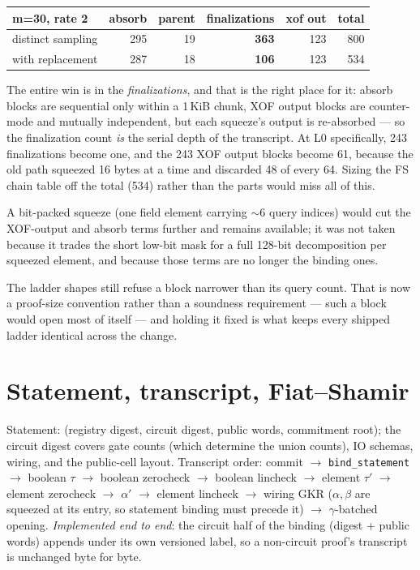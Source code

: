 \documentclass[11pt]{article}
\newcommand{\code}[1]{\texttt{#1}}
\theoremstyle{definition}
\begin{document}
\begin{center}
\begin{tabular}{lrrrrr}
\textbf{m=30, rate 2} & absorb & parent & \textbf{finalizations} & xof out & total \\
\hline
distinct sampling      & 295 & 19 & \textbf{363} & 123 & 800 \\
with replacement       & 287 & 18 & \textbf{106} & 123 & 534 \\
\end{tabular}
\end{center}

\noindent
The entire win is in the \emph{finalizations}, and that is the right
place for it: absorb blocks are sequential only within a 1\,KiB chunk,
XOF output blocks are counter-mode and mutually independent, but each
squeeze's output is re-absorbed --- so the finalization count \emph{is}
the serial depth of the transcript. At L0 specifically, 243
finalizations become one, and the 243 XOF output blocks become 61,
because the old path squeezed 16 bytes at a time and discarded 48 of
every 64. Sizing the FS chain table off the total (534) rather than the
parts would miss all of this.

A bit-packed squeeze (one field element carrying $\sim$6 query indices)
would cut the XOF-output and absorb terms further and remains available;
it was not taken because it trades the short low-bit mask for a full
128-bit decomposition per squeezed element, and because those terms are
no longer the binding ones.

The ladder shapes still refuse a block narrower than its query count.
That is now a proof-size convention rather than a soundness requirement
--- such a block would open most of itself --- and holding it fixed is
what keeps every shipped ladder identical across the change.

\section{Statement, transcript, Fiat--Shamir}\label{sec:statement}

Statement: (registry digest, circuit digest, public words, commitment
root); the circuit digest covers gate counts (which determine the union
counts), IO schemas, wiring, and the public-cell layout. Transcript order:
commit $\to$ \code{bind\_statement} $\to$ boolean $\tau$ $\to$ boolean
zerocheck $\to$ boolean lincheck $\to$ element $\tau'$ $\to$ element
zerocheck $\to$ $\alpha'$ $\to$ element lincheck $\to$ wiring GKR
($\alpha, \beta$ are squeezed at its entry, so statement binding must
precede it) $\to$ $\gamma$-batched
opening. \emph{Implemented end to end}: the circuit half of the binding
(digest + public words) appends under its own versioned label, so a
non-circuit proof's transcript is unchanged byte for byte.
\end{document}
